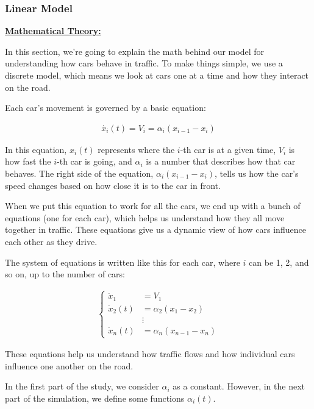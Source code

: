 \documentclass{article}
\begin{document}
		
		
		
		
		\subsubsection{Linear Model}
			\textbf{\underline{Mathematical Theory:}}
			\newline
			
			In this section, we're going to explain the math behind our model for understanding how cars behave in traffic. To make things simple, we use a discrete model, which means we look at cars one at a time and how they interact on the road.
			
			Each car's movement is governed by a basic equation:
			
			\begin{align*}
				\dot{x_i}(t) = V_i = \alpha_i(x_{i-1} - x_i)
			\end{align*}
			
			In this equation, \(x_i(t)\) represents where the \(i\)-th car is at a given time, \(V_i\) is how fast the \(i\)-th car is going, and \(\alpha_i\) is a number that describes how that car behaves. The right side of the equation, \(\alpha_i(x_{i-1} - x_i)\), tells us how the car's speed changes based on how close it is to the car in front.
			
			When we put this equation to work for all the cars, we end up with a bunch of equations (one for each car), which helps us understand how they all move together in traffic. These equations give us a dynamic view of how cars influence each other as they drive.
			
			The system of equations is written like this for each car, where \(i\) can be 1, 2, and so on, up to the number of cars:
			
			\begin{align*}
				\left\{
				\begin{array}{ll}
					\dot{x}_1 &= V_1 \\
					\dot{x}_2(t) &= \alpha_2(x_1 - x_2) \\
					&\vdots \\
					\dot{x}_n(t) &= \alpha_n(x_{n-1} - x_n)
				\end{array}
				\right.
			\end{align*}
			
			These equations help us understand how traffic flows and how individual cars influence one another on the road.
			
			In the first part of the study, we consider $\alpha_i$ as a constant. However, in the next part of the simulation, we define some functions $\alpha_i(t)$.
			
\end{document}
